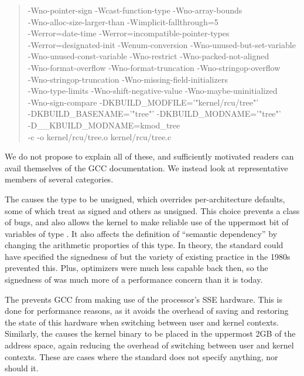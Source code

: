 \documentclass[10]{article}
\begin{document}
\begin{quote}
{{	-Wno-pointer-sign -Wcast-function-type -Wno-array-bounds \\
	-Wno-alloc-size-larger-than -Wimplicit-fallthrough=5 \\
	-Werror=date-time -Werror=incompatible-pointer-types \\
	-Werror=designated-init -Wenum-conversion
	-Wno-unused-but-set-variable \\
	-Wno-unused-const-variable -Wno-restrict -Wno-packed-not-aligned \\
	-Wno-format-overflow 
	-Wno-format-truncation -Wno-stringop-overflow \\
	-Wno-stringop-truncation
	-Wno-missing-field-initializers \\
	-Wno-type-limits
	-Wno-shift-negative-value -Wno-maybe-uninitialized \\
	-Wno-sign-compare 
	-DKBUILD\_MODFILE='"kernel/rcu/tree"' \\
	-DKBUILD\_BASENAME='"tree"' -DKBUILD\_MODNAME='"tree"' \\
	-D\_\_KBUILD\_MODNAME=kmod\_tree \\
	-c -o kernel/rcu/tree.o kernel/rcu/tree.c
	}
}
\end{quote}

We do not propose to explain all of these, and sufficiently motivated
readers can avail themselves of the GCC documentation.
We instead look at representative members of several categories.

The  causes the  type to be unsigned, which
overrides per-architecture defaults, some of which treat 
as signed and others as unsigned.
This choice prevents a class of bugs, and also allows the kernel to make
reliable use of the uppermost bit of variables of type .
It also affects the definition of ``semantic dependency'' by changing
the arithmetic proporties of this type.
In theory, the standard could have specified the signedness of 
but the variety of existing practice in the 1980s prevented this.
Plus, optimizers were much less capable back then, so the signedness of
 was much more of a performance concern than it is today.

The  prevents GCC from making use of the processor's SSE hardware.
This is done for performance reasons, as it avoids the overhead of
saving and restoring the state of this hardware when switching between
user and kernel contexts.
Similarly, the  causes the kernel binary to be
placed in the uppermost 2GB of the address space, again reducing
the overhead of switching between user and kernel contexts.
These are cases where the standard does not specify anything, nor
should it.
\end{document}
